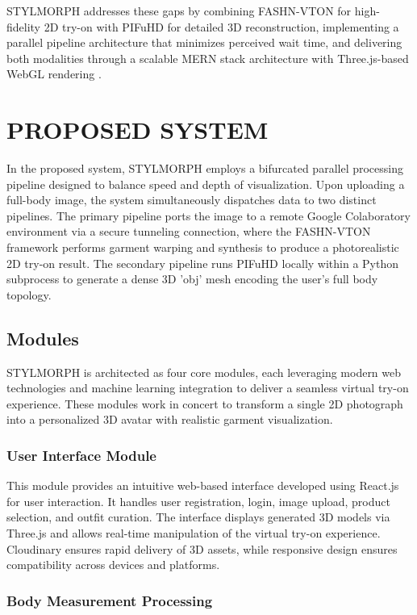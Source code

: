 \documentclass[12pt,a4paper,oneside]{report}
\begin{document}
STYLMORPH addresses these gaps by combining FASHN-VTON \cite{16} for high-fidelity 2D try-on with PIFuHD \cite{1} for detailed 3D reconstruction, implementing a parallel pipeline architecture that minimizes perceived wait time, and delivering both modalities through a scalable MERN stack architecture \cite{19} with Three.js-based WebGL rendering \cite{6}.

\chapter{PROPOSED SYSTEM}

In the proposed system, STYLMORPH employs a bifurcated parallel processing pipeline designed to balance speed and depth of visualization. Upon uploading a full-body image, the system simultaneously dispatches data to two distinct pipelines. The primary pipeline ports the image to a remote Google Colaboratory environment via a secure tunneling connection, where the FASHN-VTON framework \cite{16} performs garment warping and synthesis to produce a photorealistic 2D try-on result. The secondary pipeline runs PIFuHD \cite{1} locally within a Python subprocess to generate a dense 3D 'obj' mesh encoding the user's full body topology.

\section{Modules}

STYLMORPH is architected as four core modules, each leveraging modern web technologies and machine learning integration to deliver a seamless virtual try-on experience. These modules work in concert to transform a single 2D photograph into a personalized 3D avatar with realistic garment visualization.

\subsection{User Interface Module}

This module provides an intuitive web-based interface developed using React.js for user interaction. It handles user registration, login, image upload, product selection, and outfit curation. The interface displays generated 3D models via Three.js \cite{6} and allows real-time manipulation of the virtual try-on experience. Cloudinary ensures rapid delivery of 3D assets, while responsive design ensures compatibility across devices and platforms.

\subsection{Body Measurement Processing}
\end{document}
